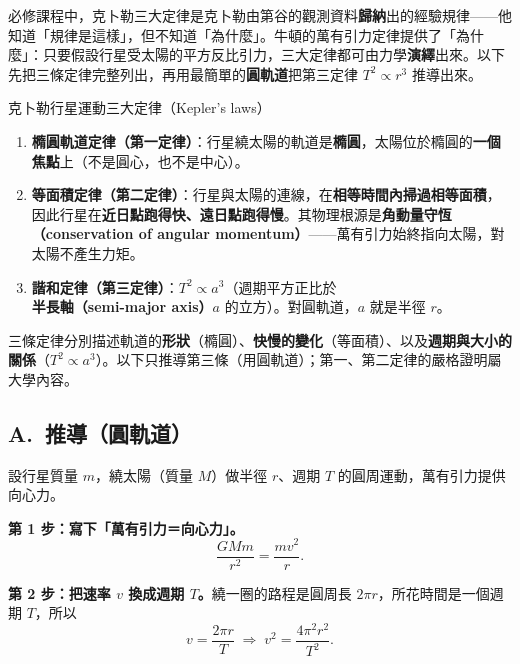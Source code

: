 \documentclass[11pt]{article}
\begin{document}
必修課程中，克卜勒三大定律是克卜勒由第谷的觀測資料\textbf{歸納}出的經驗規律——他知道「規律是這樣」，但不知道「為什麼」。牛頓的萬有引力定律提供了「為什麼」：只要假設行星受太陽的平方反比引力，三大定律都可由力學\textbf{演繹}出來。以下先把三條定律完整列出，再用最簡單的\textbf{圓軌道}把第三定律 $T^2\propto r^3$ 推導出來。

\begin{補充框}{克卜勒行星運動三大定律（Kepler's laws）}
\begin{enumerate}\setlength{\itemsep}{2pt}
\item \textbf{橢圓軌道定律（第一定律）}：行星繞太陽的軌道是\textbf{橢圓}，太陽位於橢圓的\textbf{一個焦點}上（不是圓心，也不是中心）。
\item \textbf{等面積定律（第二定律）}：行星與太陽的連線，在\textbf{相等時間內掃過相等面積}，因此行星在\textbf{近日點跑得快、遠日點跑得慢}。其物理根源是\textbf{角動量守恆（conservation of angular momentum）}——萬有引力始終指向太陽，對太陽不產生力矩。
\item \textbf{諧和定律（第三定律）}：$T^2\propto a^3$（週期平方正比於\textbf{半長軸（semi-major axis）}$a$ 的立方）。對圓軌道，$a$ 就是半徑 $r$。
\end{enumerate}
三條定律分別描述軌道的\textbf{形狀}（橢圓）、\textbf{快慢的變化}（等面積）、以及\textbf{週期與大小的關係}（$T^2\propto a^3$）。以下只推導第三條（用圓軌道）；第一、第二定律的嚴格證明屬大學內容。
\end{補充框}


\subsection*{\sffamily A.\ 推導（圓軌道）}

設行星質量 $m$，繞太陽（質量 $M$）做半徑 $r$、週期 $T$ 的圓周運動，萬有引力提供向心力。

\textbf{第 1 步：寫下「萬有引力＝向心力」。}
$$\dfrac{GMm}{r^{2}}=\dfrac{mv^{2}}{r}.$$

\textbf{第 2 步：把速率 $v$ 換成週期 $T$。}繞一圈的路程是圓周長 $2\pi r$，所花時間是一個週期 $T$，所以
$$v=\dfrac{2\pi r}{T}\;\Longrightarrow\;v^2=\dfrac{4\pi^2 r^2}{T^2}.$$
\end{document}
